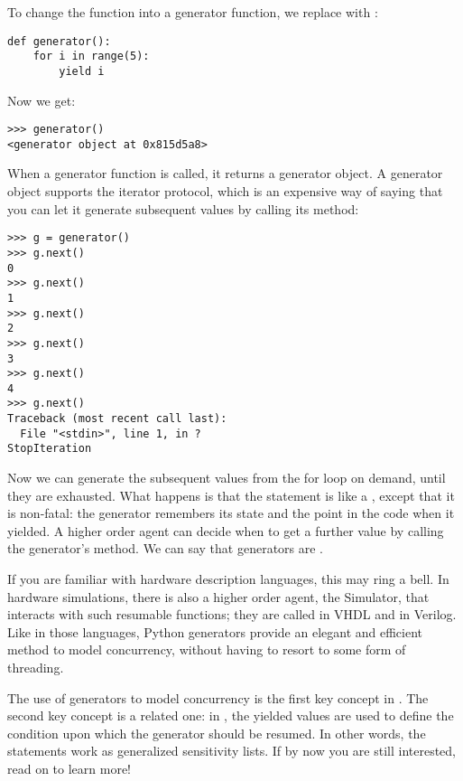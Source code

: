 To change the function into a generator function, we replace
 with :

\begin{verbatim}
def generator():
    for i in range(5):
        yield i

\end{verbatim}

Now we get:

\begin{verbatim}
>>> generator()
<generator object at 0x815d5a8>

\end{verbatim}

When a generator function is called, it returns a generator object. A
generator object supports the iterator protocol, which is an expensive
way of saying that you can let it generate subsequent values by
calling its  method:

\begin{verbatim}
>>> g = generator()
>>> g.next()
0
>>> g.next()
1
>>> g.next()
2
>>> g.next()
3
>>> g.next()
4
>>> g.next()
Traceback (most recent call last):
  File "<stdin>", line 1, in ?
StopIteration

\end{verbatim}

Now we can generate the subsequent values from the for loop on demand,
until they are exhausted. What happens is that the
 statement is like a
, except that it is non-fatal: the generator remembers
its state and the point in the code when it yielded. A higher order
agent can decide when to get a further value by calling the
generator's  method. We can say that generators are
.

If you are familiar with hardware description languages, this may ring
a bell. In hardware simulations, there is also a higher order agent,
the Simulator, that interacts with such resumable functions; they are
called  in VHDL and  in
Verilog. Like in those languages, Python generators provide an elegant
and efficient method to model concurrency, without having to resort to
some form of threading.

The use of generators to model concurrency is the first key concept in
\myhdl{}. The second key concept is a related one: in \myhdl{}, the
yielded values are used to define the condition upon which the generator
should be resumed. In other words, the  statements work
as generalized sensitivity lists. If by now you are still interested,
read on to learn more!

